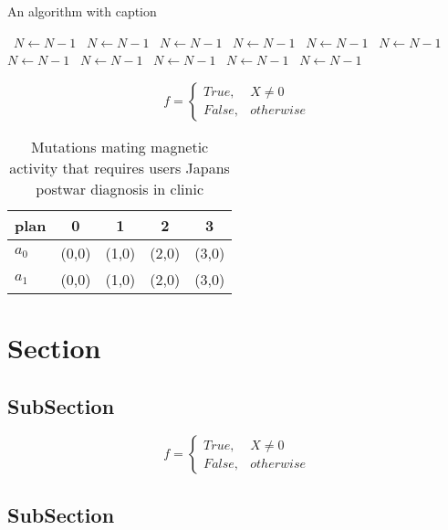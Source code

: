 \documentclass[a4paper]{article}
\begin{document}
\begin{algorithm}
\caption{An algorithm with caption}
\begin{algorithmic}
\    \State $N \gets N - 1$
\    \State $N \gets N - 1$
\    \State $N \gets N - 1$
\    \State $N \gets N - 1$
\    \State $N \gets N - 1$
\    \State $N \gets N - 1$
\    \State $N \gets N - 1$
\    \State $N \gets N - 1$
\    \State $N \gets N - 1$
\    \State $N \gets N - 1$
\    \State $N \gets N - 1$
\EndWhile
\end{algorithmic}
\end{algorithm}

\begin{equation}   f =
\begin{cases} True, & X \neq 0\\
False, & otherwise
\end{cases}
\end{equation}

\begin{table}
\begin{adjustbox}{width=0.5\columnwidth}
\begin{tabular}{|l|l|l|l|l|}
\hline
\textbf{plan} & \multicolumn{1}{c|}{\textbf{0}} & \multicolumn{1}{c|}{\textbf{1}} & \multicolumn{1}{c|}{\textbf{2}} & \multicolumn{1}{c|}{\textbf{3}} \\ \hline
\textbf{$a_0$}  & (0,0) & (1,0) & (2,0) & (3,0) \\ \hline
\textbf{$a_1$}  & (0,0) & (1,0) & (2,0) & (3,0) \\ \hline
\end{tabular}
\end{adjustbox}
\caption{Mutations mating magnetic activity that requires users Japans postwar diagnosis in clinic
}
\end{table}

\section{Section}

\subsection{SubSection}

\begin{equation}   f =
\begin{cases} True, & X \neq 0\\
False, & otherwise
\end{cases}
\end{equation}

\subsection{SubSection}
\end{document}
